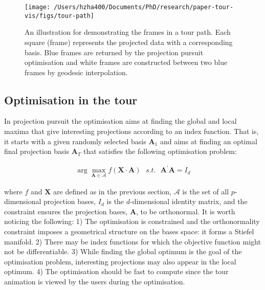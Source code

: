 \begin{Schunk}
\begin{figure}

{\centering \texttt{[image: /Users/hzha400/Documents/PhD/research/paper-tour-vis/figs/tour-path]} 

}

\caption[An illustration for demonstrating the frames in a tour path]{An illustration for demonstrating the frames in a tour path. Each square (frame) represents the projected data with a corresponding basis. Blue frames are returned by the projection pursuit optimisation and white frames are constructed between two blue frames by geodesic interpolation.}\label{fig:tour-path}
\end{figure}
\end{Schunk}

\hypertarget{tour-optim}{%
\subsection{Optimisation in the tour}\label{tour-optim}}

In projection pursuit the optimisation aims at finding the global and
local maxima that give interesting projections according to an index
function. That is, it starts with a given randomly selected basis
\(\mathbf{A}_1\) and aims at finding an optimal final projection basis
\(\mathbf{A}_T\) that satisfies the following optimisation problem:

\begin{align}
\arg \max_{\mathbf{A} \in \mathcal{A}} f(\mathbf{X} \cdot \mathbf{A})  ~~~ s.t. ~~~ \mathbf{A}^{\prime} \mathbf{A} = I_d
\end{align}

\noindent where \(f\) and \(\mathbf{X}\) are defined as in the previous
section, \(\mathcal{A}\) is the set of all \(p\)-dimensional projection
bases, \(I_d\) is the \(d\)-dimensional identity matrix, and the
constraint ensures the projection bases, \(\mathbf{A}\), to be
orthonormal. It is worth noticing the following: 1) The optimisation is
constrained and the orthonormality constraint imposes a geometrical
structure on the bases space: it forms a Stiefel manifold. 2) There may
be index functions for which the objective function might not be
differentiable. 3) While finding the global optimum is the goal of the
optimisation problem, interesting projections may also appear in the
local optimum. 4) The optimisation should be fast to compute since the
tour animation is viewed by the users during the optimisation.

